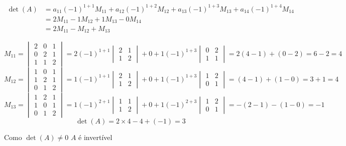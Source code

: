 \documentclass[a4paper,12pt,fleqn]{article}
\begin{document}
\begin{answer}
\begin{align*}
  \det(A)
  & = a_{11}(-1)^{1+1} M_{11}
    + a_{12}(-1)^{1+2} M_{12}
    + a_{13}(-1)^{1+3} M_{13}
    + a_{14}(-1)^{1+4} M_{14} \\
  & = 2 M_{11} - 1 M_{12} + 1 M_{13} - 0 M_{14}   \\
  & = 2 M_{11} - M_{12} + M_{13}
\end{align*}

\[
  M_{11}
  = \begin{vmatrix}
    2 & 0 & 1 \\
    0 & 2 & 1 \\
    1 & 1 & 2
  \end{vmatrix}
  = 2 (-1)^{1+1}
  \begin{vmatrix}
    2 & 1 \\
    1 & 2
  \end{vmatrix}
  + 0
  + 1 (-1)^{1+3}
  \begin{vmatrix}
    0 & 2 \\
    1 & 1
  \end{vmatrix}
  = 2(4-1)+(0-2)
  = 6 - 2
  = 4
\]
\[
  M_{12}
  = \begin{vmatrix}
    1 & 0 & 1 \\
    1 & 2 & 1 \\
    0 & 1 & 2
  \end{vmatrix}
  = 1 (-1)^{1+1}
  \begin{vmatrix}
    2 & 1 \\
    1 & 2
  \end{vmatrix}
  + 0
  + 1 (-1)^{1+3}
  \begin{vmatrix}
    1 & 2 \\
    0 & 1
  \end{vmatrix}
  = (4-1)+(1-0)
  = 3 + 1
  = 4
\]
\[
  M_{13}
  = \begin{vmatrix}
    1 & 2 & 1 \\
    1 & 0 & 1 \\
    0 & 1 & 2
  \end{vmatrix}
  = 1 (-1)^{2+1}
  \begin{vmatrix}
    1 & 1 \\
    1 & 2
  \end{vmatrix}
  + 0
  + 1 (-1)^{2+3}
  \begin{vmatrix}
    1 & 2 \\
    0 & 1
  \end{vmatrix}
  = -(2-1) - (1-0)
  = -1
\]
\[
  \det(A)
  = 2 \times 4 - 4 + (-1)
  = 3
\]

Como
\(
  \det(A) \neq 0
\)
$A$ é invertível
\end{answer}
\end{document}

